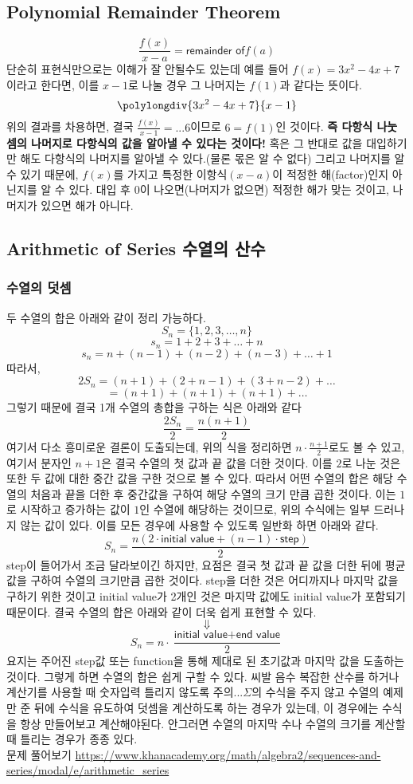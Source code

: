 \documentclass{article}
\begin{document}
\subsection{Polynomial Remainder Theorem}
$$\frac{f(x)}{x-a}={\textsf{remainder of}} f(a)$$
단순히 표현식만으로는 이해가 잘 안될수도 있는데 예를 들어 $f(x) = 3x^{2}-4x+7$이라고 한다면, 이를 $x-1$로 나눌 경우 그 나머지는 $f(1)$과 같다는 뜻이다.
$$\polylongdiv{3x^{2}-4x+7}{x-1}$$
위의 결과를 차용하면, 결국 $\frac{f(x)}{x-1}=...6$이므로 $6=f(1)$인 것이다. \textbf{즉 다항식 나눗셈의 나머지로 다항식의 값을 알아낼 수 있다는 것이다!} 혹은 그 반대로 값을 대입하기만 해도 다항식의 나머지를 알아낼 수 있다.(물론 몫은 알 수 없다) 그리고 나머지를 알 수 있기 때문에, $f(x)$를 가지고 특정한 이항식$(x-a)$이 적정한 해(factor)인지 아닌지를 알 수 있다. 대입 후 0이 나오면(나머지가 없으면) 적정한 해가 맞는 것이고, 나머지가 있으면 해가 아니다.

\subsection{Arithmetic of Series 수열의 산수}
\subsubsection{수열의 덧셈}
두 수열의 합은 아래와 같이 정리 가능하다.
$$S_n=\{1,2,3,\dots,n\}$$
$$s_n=1+2+3+\dots+n$$
$$s_n=n+(n-1)+(n-2)+(n-3)+\dots+1$$
따라서,
$$2S_n=(n+1)+(2+n-1)+(3+n-2)+\dots$$
$$=(n+1)+(n+1)+(n+1)+\dots$$
그렇기 때문에 결국 1개 수열의 총합을 구하는 식은 아래와 같다
$$\frac{2S_n}{2}=\frac{n(n+1)}{2}$$
여기서 다소 흥미로운 결론이 도출되는데, 위의 식을 정리하면 $n\cdot\frac{n+1}{2}$로도 볼 수 있고, 여기서 분자인 $n+1$은 결국 수열의 첫 값과 끝 값을 더한 것이다. 이를 $2$로 나눈 것은 또한 두 값에 대한 중간 값을 구한 것으로 볼 수 있다. 따라서 어떤 수열의 합은 해당 수열의 처음과 끝을 더한 후 중간값을 구하여 해당 수열의 크기 만큼 곱한 것이다. 이는 $1$로 시작하고 증가하는 값이 $1$인 수열에 해당하는 것이므로, 위의 수식에는 일부 드러나지 않는 값이 있다. 이를 모든 경우에 사용할 수 있도록 일반화 하면 아래와 같다.
$$S_n=\frac{n(2\cdot\textsf{initial value}+(n-1)\cdot\textsf{step})}{2}$$ step이 들어가서 조금 달라보이긴 하지만, 요점은 결국 첫 값과 끝 값을 더한 뒤에 평균 값을 구하여 수열의 크기만큼 곱한 것이다. step을 더한 것은 어디까지나 마지막 값을 구하기 위한 것이고 initial value가 2개인 것은 마지막 값에도 initial value가 포함되기 때문이다. 결국 수열의 합은 아래와 같이 더욱 쉽게 표현할 수 있다.
$$\Downarrow$$
$$S_n=n\cdot\frac{\textsf{initial value} + \textsf{end value}}{2}$$
요지는 주어진 step값 또는 function을 통해 제대로 된 초기값과 마지막 값을 도출하는 것이다. 그렇게 하면 수열의 합은 쉽게 구할 수 있다.
{\color{red}씨발 음수} 복잡한 산수를 하거나 계산기를 사용할 때 숫자입력 틀리지 않도록 주의...$\Sigma$의 수식을 주지 않고 수열의 예제만 준 뒤에 수식을 유도하여 덧셈을 계산하도록 하는 경우가 있는데, 이 경우에는 수식을 항상 만들어보고 계산해야된다. 안그러면 수열의 마지막 수나 수열의 크기를 계산할 때 틀리는 경우가 종종 있다.\\
문제 풀어보기 \url{https://www.khanacademy.org/math/algebra2/sequences-and-series/modal/e/arithmetic_series}\\
\end{document}
